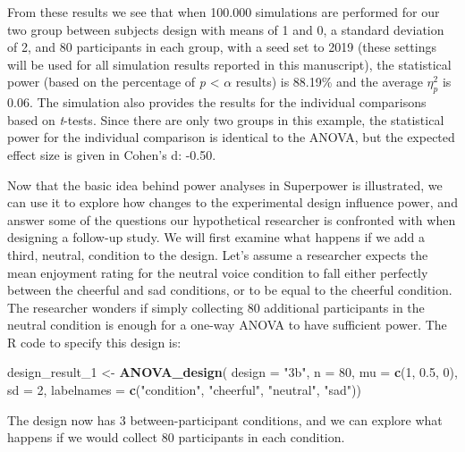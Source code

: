 \documentclass[,man,floatsintext]{apa6}
\newenvironment{Shaded}{\begin{snugshade}}{\end{snugshade}}
\newcommand{\DataTypeTok}[1]{\textcolor[rgb]{0.13,0.29,0.53}{#1}}
\newcommand{\DecValTok}[1]{\textcolor[rgb]{0.00,0.00,0.81}{#1}}
\newcommand{\FloatTok}[1]{\textcolor[rgb]{0.00,0.00,0.81}{#1}}
\newcommand{\KeywordTok}[1]{\textcolor[rgb]{0.13,0.29,0.53}{\textbf{#1}}}
\newcommand{\NormalTok}[1]{#1}
\newcommand{\StringTok}[1]{\textcolor[rgb]{0.31,0.60,0.02}{#1}}
\begin{document}
From these results we see that when 100.000 simulations are performed for our two group between subjects design with means of 1 and 0, a standard deviation of 2, and 80 participants in each group, with a seed set to 2019 (these settings will be used for all simulation results reported in this manuscript), the statistical power (based on the percentage of \emph{p} \textless{} \(\alpha\) results) is 88.19\% and the average \(\eta_p^2\) is 0.06.
The simulation also provides the results for the individual comparisons based on \emph{t}-tests.
Since there are only two groups in this example, the statistical power for the individual comparison is identical to the ANOVA, but the expected effect size is given in Cohen's d: -0.50.

Now that the basic idea behind power analyses in Superpower is illustrated, we can use it to explore how changes to the experimental design influence power, and answer some of the questions our hypothetical researcher is confronted with when designing a follow-up study.
We will first examine what happens if we add a third, neutral, condition to the design.
Let's assume a researcher expects the mean enjoyment rating for the neutral voice condition to fall either perfectly between the cheerful and sad conditions, or to be equal to the cheerful condition.
The researcher wonders if simply collecting 80 additional participants in the neutral condition is enough for a one-way ANOVA to have sufficient power.
The R code to specify this design is:

\begin{Shaded}
\begin{Highlighting}[]
\NormalTok{design_result_}\DecValTok{1}\NormalTok{ <-}\StringTok{ }\KeywordTok{ANOVA_design}\NormalTok{(}
  \DataTypeTok{design =} \StringTok{"3b"}\NormalTok{, }
  \DataTypeTok{n =} \DecValTok{80}\NormalTok{, }
  \DataTypeTok{mu =} \KeywordTok{c}\NormalTok{(}\DecValTok{1}\NormalTok{, }\FloatTok{0.5}\NormalTok{, }\DecValTok{0}\NormalTok{),}
  \DataTypeTok{sd =} \DecValTok{2}\NormalTok{, }
  \DataTypeTok{labelnames =} \KeywordTok{c}\NormalTok{(}\StringTok{"condition"}\NormalTok{, }\StringTok{"cheerful"}\NormalTok{, }\StringTok{"neutral"}\NormalTok{, }\StringTok{"sad"}\NormalTok{))}
\end{Highlighting}
\end{Shaded}

The design now has 3 between-participant conditions, and we can explore what happens if we would collect 80 participants in each condition.
\end{document}
